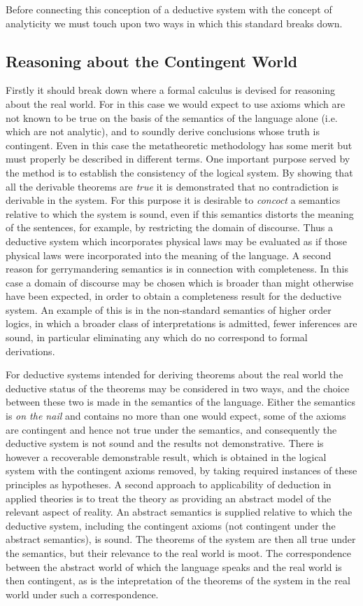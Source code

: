 \documentclass{rbjk}
\begin{document}
\begin{article}
Before connecting this conception of a deductive system with the concept of analyticity we must touch upon two ways in which this standard breaks down.

\subsection{Reasoning about the Contingent World}

Firstly it should break down where a formal calculus is devised for reasoning about the real world.
For in this case we would expect to use axioms which are not known to be true on the basis of the semantics of the language alone (i.e. which are not analytic), and to soundly derive conclusions whose truth is contingent.
Even in this case the metatheoretic methodology has some merit but must properly be described in different terms.
One important purpose served by the method is to establish the consistency of the logical system.
By showing that all the derivable theorems are {\it true} it is demonstrated that no contradiction is derivable in the system.
For this purpose it is desirable to {\it concoct} a semantics relative to which the system is sound, even if this semantics distorts the meaning of the sentences, for example, by restricting the domain of discourse.
Thus a deductive system which incorporates physical laws may be evaluated as if those physical laws were incorporated into the meaning of the language.
A second reason for gerrymandering semantics is in connection with completeness.
In this case a domain of discourse may be chosen which is broader than might otherwise have been expected, in order to obtain a completeness result for the deductive system.
An example of this is in the non-standard semantics of higher order logics, in which a broader class of interpretations is admitted, fewer inferences are sound, in particular eliminating any which do no correspond to formal derivations.

For deductive systems intended for deriving theorems about the real world the deductive status of the theorems may be considered in two ways, and the choice between these two is made in the semantics of the language.
Either the semantics is {\it on the nail} and contains no more than one would expect, some of the axioms are contingent and hence not true under the semantics, and consequently the deductive system is not sound and the results not demonstrative.
There is however a recoverable demonstrable result, which is obtained in the logical system with the contingent axioms removed, by taking required instances of these principles as hypotheses.
A second approach to applicability of deduction in applied theories is to treat the theory as providing an abstract model of the relevant aspect of reality.
An abstract semantics is supplied relative to which the deductive system, including the contingent axioms (not contingent under the abstract semantics), is sound.
The theorems of the system are then all true under the semantics, but their relevance to the real world is moot.
The correspondence between the abstract world of which the language speaks and the real world is then contingent, as is the intepretation of the theorems of the system in the real world under such a correspondence.


\end{article}
\end{document}
